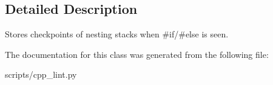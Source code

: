 \subsection{Detailed Description}
\begin{DoxyVerb}Stores checkpoints of nesting stacks when #if/#else is seen.\end{DoxyVerb}
 

The documentation for this class was generated from the following file\+:\begin{DoxyCompactItemize}
\item 
scripts/cpp\+\_\+lint.\+py\end{DoxyCompactItemize}
